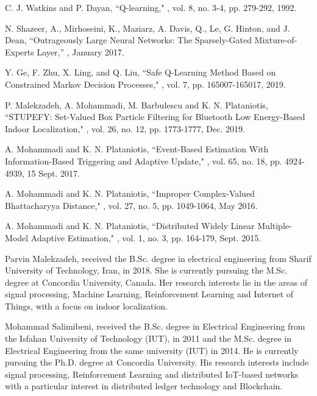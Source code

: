 \documentclass{ieeeaccess}
\begin{document}
\begin{thebibliography}{46}
 C. J. Watkins and P. Dayan,
\newblock ``Q-learning,"
, vol. 8, no. 3-4, pp. 279-292, 1992.

N. Shazeer, A., Mirhoseini, K., Maziarz, A. Davis, Q., Le, G. Hinton, and J. Dean,  \newblock ``Outrageously Large Neural Networks: The Sparsely-Gated Mixture-of-Experts Layer,''
, January 2017.

Y. Ge, F. Zhu, X. Ling, and Q. Liu,
\newblock ``Safe Q-Learning Method Based on Constrained Markov Decision Processes,"
, vol. 7, pp. 165007-165017, 2019.

P. Malekzadeh, A. Mohammadi, M. Barbulescu and K. N. Plataniotis,
\newblock ``STUPEFY: Set-Valued Box Particle Filtering for Bluetooth Low Energy-Based Indoor Localization,"
, vol. 26, no. 12, pp. 1773-1777, Dec. 2019.

A. Mohammadi and K. N. Plataniotis,
\newblock ``Event-Based Estimation With Information-Based Triggering and Adaptive Update,"
, vol. 65, no. 18, pp. 4924-4939, 15 Sept. 2017.

A. Mohammadi and K. N. Plataniotis,
\newblock ``Improper Complex-Valued Bhattacharyya Distance,"
, vol. 27, no. 5, pp. 1049-1064, May 2016.

A. Mohammadi and K. N. Plataniotis,
\newblock ``Distributed Widely Linear Multiple-Model Adaptive Estimation,"
, vol. 1, no. 3, pp. 164-179, Sept. 2015.


\end{thebibliography}

\begin{IEEEbiography}{Parvin Malekzadeh}, received the B.Sc. degree in electrical engineering from Sharif University of Technology, Iran, in 2018. She is currently pursuing the M.Sc. degree at Concordia University, Canada. Her research interests lie in the areas of signal processing, Machine Learning, Reinforcement Learning and Internet of Things, with a focus on indoor localization.
\end{IEEEbiography}
%
\begin{IEEEbiography}{Mohammad Salimibeni}, received the B.Sc. degree in Electrical Engineering from the Isfahan University of Technology (IUT), in 2011 and the M.Sc. degree in Electrical Engineering from the same university (IUT) in 2014. He is currently pursuing the Ph.D. degree  at Concordia University. His research interests include signal processing, Reinforcement Learning and distributed IoT-based networks with a particular interest in distributed ledger technology and Blockchain.
\end{IEEEbiography}
\end{document}
